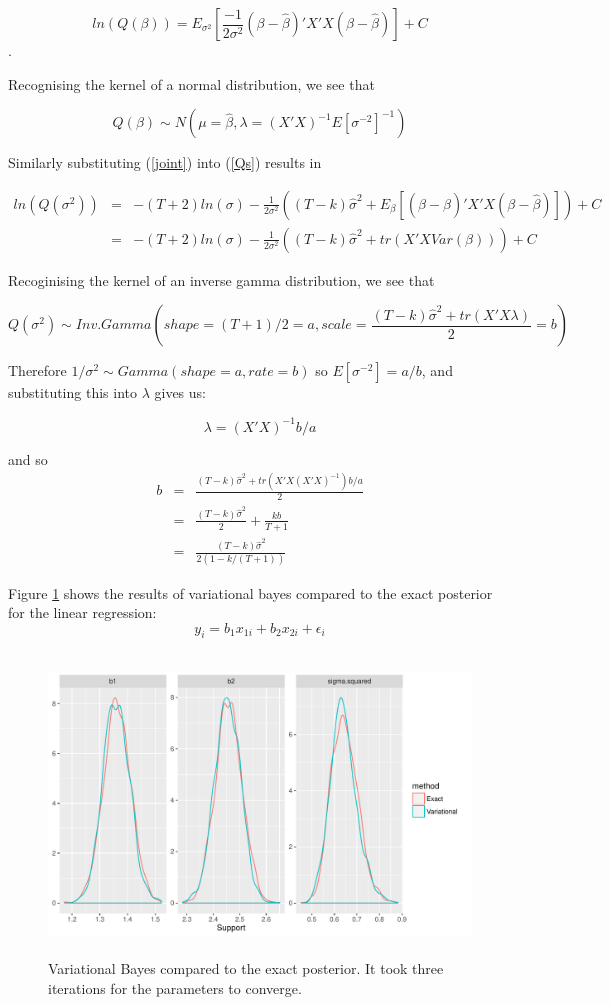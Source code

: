 \documentclass{article}
\begin{document}
$$ln(Q(\beta)) = E_{\sigma^2}\left[ \frac{-1}{2\sigma^2} (\beta-\hat{\beta})'X'X(\beta-\hat{\beta}) \right] + C$$.

Recognising the kernel of a normal distribution, we see that

$$Q(\beta) \sim N(\mu = \hat{\beta}, \lambda = (X'X)^{-1} E[\sigma^{-2}]^{-1})$$

Similarly substituting (\ref{joint}) into (\ref{Qs}) results in

\begin{eqnarray}
ln(Q(\sigma^2)) & = &  -(T+2)ln(\sigma) - \frac{1}{2\sigma^2} \left( (T-k)\hat{\sigma}^2 + E_{\beta}[(\beta-\hat{\beta})'X'X(\beta-\hat{\beta})] \right) + C \nonumber \\
& = & -(T+2)ln(\sigma) - \frac{1}{2\sigma^2} \left( (T-k)\hat{\sigma}^2 + tr(X'X Var(\beta)) \right) + C \nonumber
\end{eqnarray}

Recoginising the kernel of an inverse gamma distribution, we see that

$$Q(\sigma^2) \sim Inv.Gamma ( shape = (T+1)/2 = a, scale = \frac{(T-k)\hat{\sigma}^2 + tr(X'X \lambda)}{2} = b)$$

Therefore $1/\sigma^2 \sim Gamma(shape = a, rate = b)$ so $E[\sigma^{-2}] = a/b$, and substituting this into $\lambda$ gives us:


$$\lambda = (X'X)^{-1} b/a $$

and so
\begin{eqnarray}
b & = & \frac{(T-k)\hat{\sigma}^2 + tr(X'X (X'X)^{-1})b/a}{2} \nonumber \\
& = & \frac{(T-k)\hat{\sigma}^2}{2} + \frac{kb}{T+1} \nonumber \\
& = & \frac{(T-k)\hat{\sigma}^2}{2(1-k/(T+1))} \nonumber
\end{eqnarray}

Figure \ref{ex} shows the results of variational bayes compared to the exact posterior for the linear regression: $$y_{i} = b_{1} x_{1i} + b_{2} x_{2i} + \epsilon_{i}$$ 


\begin{figure}[htbp]
  \includegraphics[height=8cm,keepaspectratio]{varbayes.pdf}
  \caption{Variational Bayes compared to the exact posterior. It took three iterations for the parameters to converge.}
  \label{ex}
\end{figure}
\end{document}
